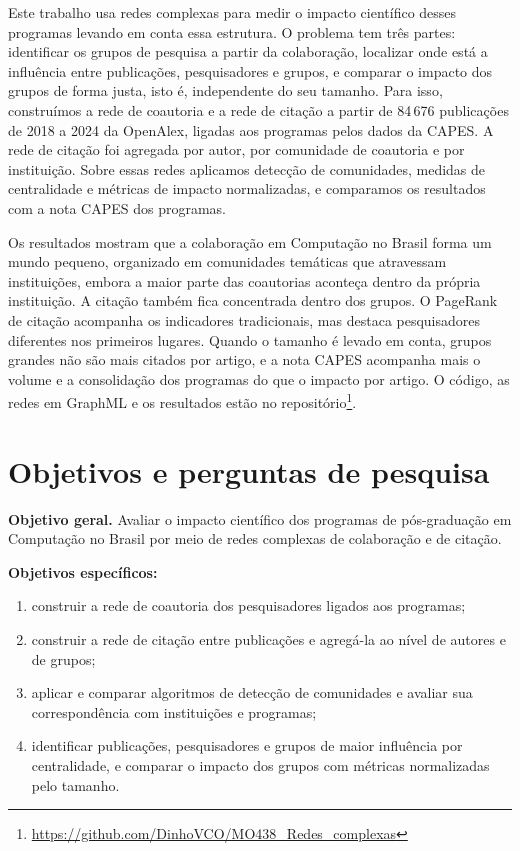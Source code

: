 \documentclass[12pt]{projeto}
\begin{document}
Este trabalho usa redes complexas para medir o impacto científico desses programas levando em conta essa estrutura. O problema tem três partes: identificar os grupos de pesquisa a partir da colaboração, localizar onde está a influência entre publicações, pesquisadores e grupos, e comparar o impacto dos grupos de forma justa, isto é, independente do seu tamanho. Para isso, construímos a rede de coautoria e a rede de citação a partir de 84\,676 publicações de 2018 a 2024 da OpenAlex, ligadas aos programas pelos dados da CAPES. A rede de citação foi agregada por autor, por comunidade de coautoria e por instituição. Sobre essas redes aplicamos detecção de comunidades, medidas de centralidade e métricas de impacto normalizadas, e comparamos os resultados com a nota CAPES dos programas.

Os resultados mostram que a colaboração em Computação no Brasil forma um mundo pequeno, organizado em comunidades temáticas que atravessam instituições, embora a maior parte das coautorias aconteça dentro da própria instituição. A citação também fica concentrada dentro dos grupos. O PageRank de citação acompanha os indicadores tradicionais, mas destaca pesquisadores diferentes nos primeiros lugares. Quando o tamanho é levado em conta, grupos grandes não são mais citados por artigo, e a nota CAPES acompanha mais o volume e a consolidação dos programas do que o impacto por artigo. O código, as redes em GraphML e os resultados estão no repositório\footnote{\url{https://github.com/DinhoVCO/MO438_Redes_complexas}}.

\section{Objetivos e perguntas de pesquisa}

\textbf{Objetivo geral.} Avaliar o impacto científico dos programas de pós-graduação em Computação no Brasil por meio de redes complexas de colaboração e de citação.

\textbf{Objetivos específicos:}
\begin{enumerate}
\item[(i)] construir a rede de coautoria dos pesquisadores ligados aos programas;
\item[(ii)] construir a rede de citação entre publicações e agregá-la ao nível de autores e de grupos;
\item[(iii)] aplicar e comparar algoritmos de detecção de comunidades e avaliar sua correspondência com instituições e programas;
\item[(iv)] identificar publicações, pesquisadores e grupos de maior influência por centralidade, e comparar o impacto dos grupos com métricas normalizadas pelo tamanho.
\end{enumerate}
\end{document}

